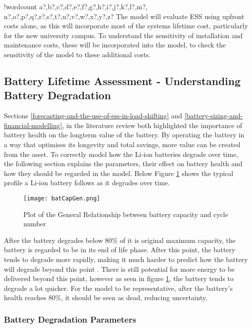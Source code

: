 \documentclass[fontsize=9.5pt]{extarticle}
\numberwithin{figure}{section} %
\newcounter{words}
\newenvironment{counted}{%
  \setcounter{words}{0}
  \SearchList!{wordcount}{\stepcounter{words}}
    {a?,b?,c?,d?,e?,f?,g?,h?,i?,j?,k?,l?,m?,
    n?,o?,p?,q?,r?,s?,t?,u?,v?,w?,x?,y?,z?}
  \UndoBoundary{'}
  \SearchOrder{p;}}{%
  \StopSearching}
\begin{document}
\begin{counted}
The model will evaluate ESS using upfront costs alone, as this will
incorporate most of the systems lifetime cost, particularly for the new
university campus. To understand the sensitivity of installation and
maintenance costs, these will be incorporated into the model, to check
the sensitivity of the model to these additional costs.

\subsection{Battery Lifetime Assessment - Understanding Battery
Degradation}\label{battery-lifetime-assessment---understanding-battery-degradation}

Sections \ref{forecasting-and-the-use-of-ess-in-load-shifting} and
\ref{battery-sizing-and-financial-modelling}, in the literature review
both highlighted the importance of battery health on the longterm value
of the battery. By operating the battery in a way that optimises its
longevity and total savings, more value can be created from the asset.
To correctly model how the Li-ion batteries degrade over time, the
following section explains the parameters, their effect on battery
health and how they should be regarded in the model. Below Figure
\ref{batCapGen} shows the typical profile a Li-ion battery follows as it
degrades over time.

\begin{figure}[H]
  \centering
  \texttt{[image: batCapGen.png]}
  \caption{Plot of the General Relationship between battery capacity and cycle number \cite{spotnitz2003simulation} }
  \label{batCapGen}
\end{figure}

After the battery degrades below 80\% of it is original maximum
capacity, the battery is regarded to be in its end of life phase. After
this point, the battery tends to degrade more rapidly, making it much
harder to predict how the battery will degrade beyond this point
\cite{spotnitz2003simulation}. There is still potential for more energy
to be delivered beyond this point, however as seen in figure
\ref{batCapGen}, the battery tends to degrade a lot quicker. For the
model to be representative, after the battery's health reaches 80\%, it
should be seen as dead, reducing uncertainty.

\subsubsection{Battery Degradation
Parameters}\label{battery-degradation-parameters}


\end{counted}
\end{document}
